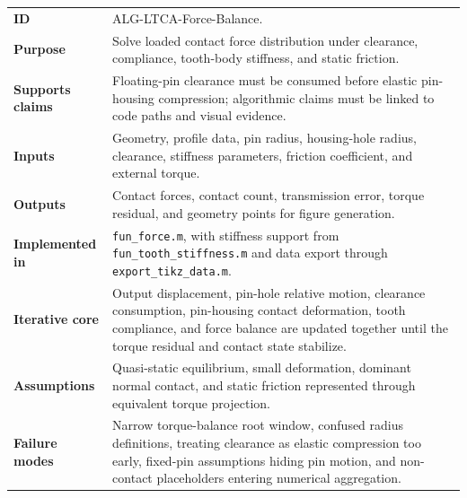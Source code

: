\documentclass{article}
\begin{document}
\begin{tcolorbox}[colback=orange!4!white,colframe=orange!70!black,title=Algorithm Passport: Loaded Contact Solver,arc=4mm,boxrule=1pt]
\small
\begin{tabular}{>{\bfseries}p{3.0cm}p{10.5cm}}
\toprule
ID & ALG-LTCA-Force-Balance. \\
Purpose & Solve loaded contact force distribution under clearance, compliance, tooth-body stiffness, and static friction. \\
Supports claims & Floating-pin clearance must be consumed before elastic pin-housing compression; algorithmic claims must be linked to code paths and visual evidence. \\
Inputs & Geometry, profile data, pin radius, housing-hole radius, clearance, stiffness parameters, friction coefficient, and external torque. \\
Outputs & Contact forces, contact count, transmission error, torque residual, and geometry points for figure generation. \\
Implemented in & \texttt{fun\_force.m}, with stiffness support from \texttt{fun\_tooth\_stiffness.m} and data export through \texttt{export\_tikz\_data.m}. \\
Iterative core & Output displacement, pin-hole relative motion, clearance consumption, pin-housing contact deformation, tooth compliance, and force balance are updated together until the torque residual and contact state stabilize. \\
Assumptions & Quasi-static equilibrium, small deformation, dominant normal contact, and static friction represented through equivalent torque projection. \\
Failure modes & Narrow torque-balance root window, confused radius definitions, treating clearance as elastic compression too early, fixed-pin assumptions hiding pin motion, and non-contact placeholders entering numerical aggregation. \\
\bottomrule
\end{tabular}
\end{tcolorbox}
\end{document}
